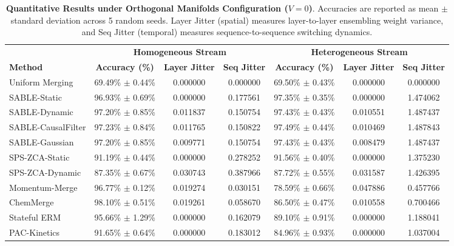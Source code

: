 \begin{table}[t]
\caption{\textbf{Quantitative Results under Orthogonal Manifolds Configuration ($V = 0$)}. Accuracies are reported as mean $\pm$ standard deviation across 5 random seeds. Layer Jitter (spatial) measures layer-to-layer ensembling weight variance, and Seq Jitter (temporal) measures sequence-to-sequence switching dynamics.}
\label{tab:orthogonal_results}
\vskip 0.15in
\begin{center}
\setlength{\tabcolsep}{4.0pt}
\begin{small}
\begin{sc}
\begin{tabular}{lcccccc}
\toprule
 & \multicolumn{3}{c}{\textbf{Homogeneous Stream}} & \multicolumn{3}{c}{\textbf{Heterogeneous Stream}} \\
\cmidrule(r){2-4} \cmidrule(l){5-7}
\textbf{Method} & \textbf{Accuracy (\%)} & \textbf{Layer Jitter} & \textbf{Seq Jitter} & \textbf{Accuracy (\%)} & \textbf{Layer Jitter} & \textbf{Seq Jitter} \\
\midrule
Uniform Merging   & 69.49\% $\pm$ 0.44\% & 0.000000 & 0.000000 & 69.50\% $\pm$ 0.43\% & 0.000000 & 0.000000 \\
SABLE-Static      & 96.93\% $\pm$ 0.69\% & 0.000000 & 0.177561 & 97.35\% $\pm$ 0.35\% & 0.000000 & 1.474062 \\
SABLE-Dynamic     & 97.20\% $\pm$ 0.85\% & 0.011837 & 0.150754 & 97.43\% $\pm$ 0.43\% & 0.010551 & 1.487437 \\
SABLE-CausalFilter & 97.23\% $\pm$ 0.84\% & 0.011765 & 0.150822 & 97.49\% $\pm$ 0.44\% & 0.010469 & 1.487843 \\
SABLE-Gaussian    & 97.20\% $\pm$ 0.85\% & 0.009771 & 0.150754 & 97.43\% $\pm$ 0.43\% & 0.008479 & 1.487437 \\
SPS-ZCA-Static    & 91.19\% $\pm$ 0.44\% & 0.000000 & 0.278252 & 91.56\% $\pm$ 0.40\% & 0.000000 & 1.375230 \\
SPS-ZCA-Dynamic   & 87.35\% $\pm$ 0.67\% & 0.030743 & 0.387966 & 87.72\% $\pm$ 0.55\% & 0.031587 & 1.426395 \\
Momentum-Merge    & 96.77\% $\pm$ 0.12\% & 0.019274 & 0.030151 & 78.59\% $\pm$ 0.66\% & 0.047886 & 0.457766 \\
ChemMerge         & 98.10\% $\pm$ 0.51\% & 0.019261 & 0.058670 & 86.50\% $\pm$ 0.47\% & 0.010558 & 0.700466 \\
Stateful ERM      & 95.66\% $\pm$ 1.29\% & 0.000000 & 0.162079 & 89.10\% $\pm$ 0.91\% & 0.000000 & 1.188041 \\
PAC-Kinetics      & 91.65\% $\pm$ 0.64\% & 0.000000 & 0.183012 & 84.96\% $\pm$ 0.93\% & 0.000000 & 1.037004 \\

\end{tabular}
\end{sc}
\end{small}
\end{center}
\end{table}
